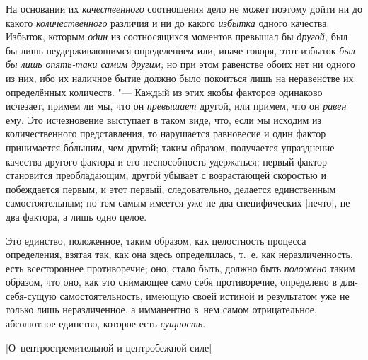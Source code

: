 На основании их {\em качественного} соотношения дело не может поэтому дойти ни
до какого {\em количественного} различия и ни до какого {\em избытка} одного
качества. Избыток, которым {\em один} из соотносящихся моментов превышал бы
{\em другой,} был бы лишь неудерживающимся определением или, иначе говоря, этот
избыток {\em был бы лишь опять-таки самим другим;} но при этом равенстве обоих
нет ни одного из них, ибо их наличное бытие должно было покоиться лишь на
неравенстве их определённых количеств. "--- Каждый из этих якобы факторов
одинаково исчезает, примем ли мы, что он {\em превышает} другой, или примем,
что он {\em равен} ему. Это исчезновение выступает в таком виде, что, если мы
исходим из количественного представления, то нарушается равновесие и один
фактор принимается б\'{о}льшим, чем другой; таким образом, получается
упразднение качества другого фактора и его неспособность удержаться; первый
фактор становится преобладающим, другой убывает с возрастающей скоростью и
побеждается первым, и этот первый, следовательно, делается единственным
самостоятельным; но тем самым имеется уже не два специфических [нечто], не два
фактора, а лишь одно целое.

Это единство, положенное, таким образом, как целостность процесса определения,
взятая так, как она здесь определилась, т.~е. как неразличенность, есть
всестороннее противоречие; оно, стало быть, должно быть {\em положено} таким
образом, что оно, как это снимающее само себя противоречие, определено в
для-себя-сущую самостоятельность, имеющую своей истиной и результатом уже не
только лишь неразличенное, а имманентно в~нем самом отрицательное, абсолютное
единство, которое есть {\em сущность}.

%
{[О~центростремительной и центробежной силе]}

